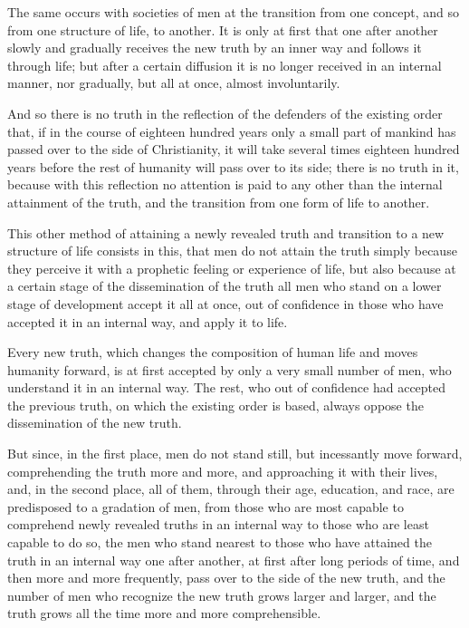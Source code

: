 \documentclass{book}
\begin{document}
The same occurs with societies of men at the transition from one concept, and so from one structure of life, to another. It is only at first that one after another slowly and gradually receives the new truth by an inner way and follows it through life; but after a certain diffusion it is no longer received in an internal manner, nor gradually, but all at once, almost involuntarily.

And so there is no truth in the reflection of the defenders of the existing order that, if in the course of eighteen hundred years only a small part of mankind has passed over to the side of Christianity, it will take several times eighteen hundred years before the rest of humanity will pass over to its side; there is no truth in it, because with this reflection no attention is paid to any other than the internal attainment of the truth, and the transition from one form of life to another.

This other method of attaining a newly revealed truth and transition to a new structure of life consists in this, that men do not attain the truth simply because they perceive it with a prophetic feeling or experience of life, but also because at a certain stage of the dissemination of the truth all men who stand on a lower stage of development accept it all at once, out of confidence in those who have accepted it in an internal way, and apply it to life.

Every new truth, which changes the composition of human life and moves humanity forward, is at first accepted by only a very small number of men, who understand it in an internal way. The rest, who out of confidence had accepted the previous truth, on which the existing order is based, always oppose the dissemination of the new truth.

But since, in the first place, men do not stand still, but incessantly move forward, comprehending the truth more and more, and approaching it with their lives, and, in the second place, all of them, through their age, education, and race, are predisposed to a gradation of men, from those who are most capable to comprehend newly revealed truths in an internal way to those who are least capable to do so, the men who stand nearest to those who have attained the truth in an internal way one after another, at first after long periods of time, and then more and more frequently, pass over to the side of the new truth, and the number of men who recognize the new truth grows larger and larger, and the truth grows all the time more and more comprehensible.
\end{document}
